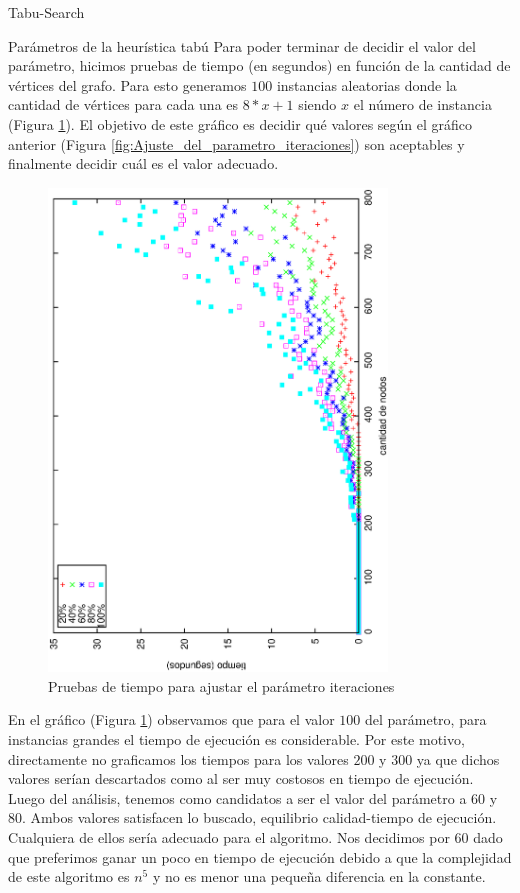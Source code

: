 \begin{section}{Tabu-Search}
\begin{subsection}{Parámetros de la heurística tabú}
	Para poder terminar de decidir el valor del parámetro, hicimos pruebas de tiempo (en segundos) en función de la cantidad de vértices del grafo. Para esto generamos $100$ instancias aleatorias donde la cantidad de vértices para cada una es $8*x+1$ siendo $x$ el número de instancia (Figura \ref{fig:Ajuste_del_parametro_iteraciones2}). El objetivo de este gráfico es decidir qué valores según el gráfico anterior (Figura \ref{fig:Ajuste_del_parametro_iteraciones}) son aceptables y finalmente decidir cuál es el valor adecuado.

	\begin{figure}[H]
		\centering
		    	\includegraphics[width=9cm,angle=-90]{tabu_search/time.eps}
		\caption{Pruebas de tiempo para ajustar el parámetro iteraciones}
		\label{fig:Ajuste_del_parametro_iteraciones2}
	\end{figure}
	
	En el gráfico (Figura \ref{fig:Ajuste_del_parametro_iteraciones2}) observamos que para el valor $100$ del parámetro, para instancias grandes el tiempo de ejecución es considerable. Por este motivo, directamente no graficamos los tiempos para los valores $200$ y $300$ ya que dichos valores serían descartados como al ser muy costosos en tiempo de ejecución.
	Luego del análisis, tenemos como candidatos a ser el valor del parámetro a $60$ y $80$. Ambos valores satisfacen lo buscado, equilibrio calidad-tiempo de ejecución. Cualquiera de ellos sería adecuado para el algoritmo. Nos decidimos por $60$ dado que preferimos ganar un poco en tiempo de ejecución debido a que la complejidad de este algoritmo es $n^5$ y no es menor una pequeña diferencia en la constante.
	\end{subsection}
\end{section}
